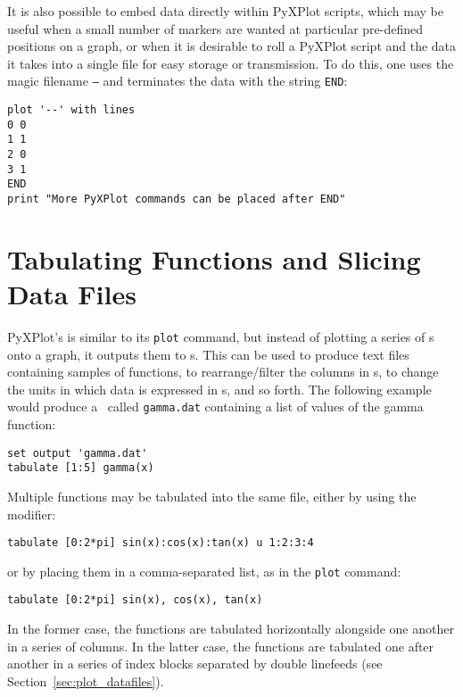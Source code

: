 It is also possible to embed data directly within PyXPlot scripts, which may be
useful when a small number of markers are wanted at particular pre-defined
positions on a graph, or when it is desirable to roll a PyXPlot script and the
data it takes into a single file for easy storage or transmission. To do this,
one uses the magic filename {\tt --} and terminates the data with the string
{\tt END}:

\begin{verbatim}
plot '--' with lines
0 0
1 1
2 0
3 1
END
print "More PyXPlot commands can be placed after END"
\end{verbatim}

\section{Tabulating Functions and Slicing Data Files}
\label{sec:tabulate}

PyXPlot's  is similar to its {\tt plot} command, but instead
of plotting a series of \datapoint s onto a graph, it outputs them to \datafile
s. This can be used to produce text files containing samples of functions, to
rearrange/filter the columns in \datafile s, to change the units in which data
is expressed in \datafile s, and so forth.  The following example would produce
a \datafile\ called {\tt gamma.dat} containing a list of values of the gamma
function:

\begin{verbatim}
set output 'gamma.dat'
tabulate [1:5] gamma(x)
\end{verbatim}

\noindent Multiple functions may be tabulated into the same file, either by
using the  modifier:

\begin{verbatim}
tabulate [0:2*pi] sin(x):cos(x):tan(x) u 1:2:3:4
\end{verbatim}

\noindent or by placing them in a comma-separated list, as in the {\tt plot}
command:

\begin{verbatim}
tabulate [0:2*pi] sin(x), cos(x), tan(x)
\end{verbatim}

In the former case, the functions are tabulated horizontally alongside one
another in a series of columns. In the latter case, the functions are tabulated
one after another in a series of index blocks separated by double linefeeds
(see Section~\ref{sec:plot_datafiles}).

